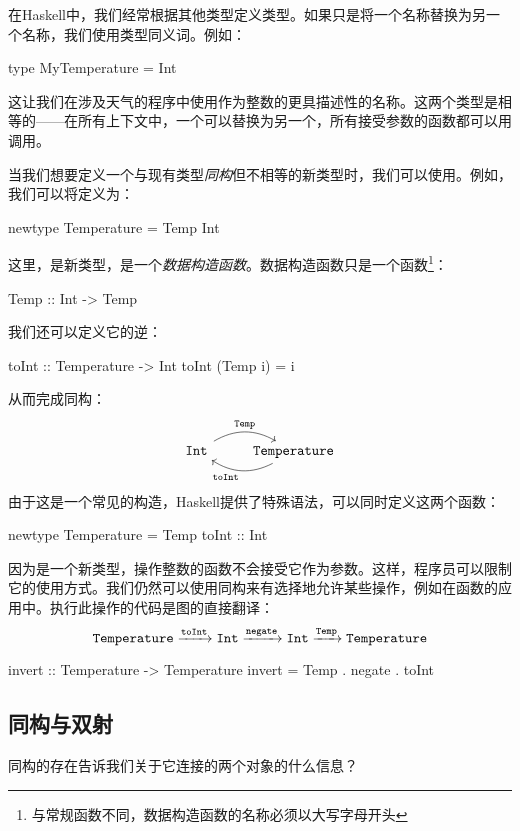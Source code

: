 \documentclass[DaoFP]{subfiles}
\begin{document}
在Haskell中，我们经常根据其他类型定义类型。如果只是将一个名称替换为另一个名称，我们使用类型同义词。例如：
\begin{haskell}
type MyTemperature = Int
\end{haskell}
这让我们在涉及天气的程序中使用作为整数的更具描述性的名称。这两个类型是相等的——在所有上下文中，一个可以替换为另一个，所有接受参数的函数都可以用调用。

当我们想要定义一个与现有类型\emph{同构}但不相等的新类型时，我们可以使用。例如，我们可以将定义为：
\begin{haskell}
newtype Temperature = Temp Int
\end{haskell}
这里，是新类型，是一个\emph{数据构造函数}。数据构造函数只是一个函数\footnote{与常规函数不同，数据构造函数的名称必须以大写字母开头}：
\begin{haskell}
Temp :: Int -> Temp
\end{haskell}
我们还可以定义它的逆：
\begin{haskell}
toInt :: Temperature -> Int
toInt (Temp i) = i
\end{haskell}
从而完成同构：
\[
 \begin{tikzcd}
 \hask{Int}
 \arrow[r, bend left, "\hask{Temp}"]
 & \hask{Temperature}
 \arrow[l, bend left, "\hask{toInt}"]
 \end{tikzcd}
\]
由于这是一个常见的构造，Haskell提供了特殊语法，可以同时定义这两个函数：
\begin{haskell}
newtype Temperature = Temp { toInt :: Int}
\end{haskell}

因为是一个新类型，操作整数的函数不会接受它作为参数。这样，程序员可以限制它的使用方式。我们仍然可以使用同构来有选择地允许某些操作，例如在函数的应用中。执行此操作的代码是图的直接翻译：
\[ \hask{Temperature} \xrightarrow{\hask{toInt}} \hask{Int} \xrightarrow{\hask{negate}} \hask{Int} \xrightarrow{\hask{Temp}} \hask{Temperature} \]
\begin{haskell}
invert :: Temperature -> Temperature
invert = Temp . negate . toInt
\end{haskell}


\subsection{同构与双射}

同构的存在告诉我们关于它连接的两个对象的什么信息？
\end{document}
